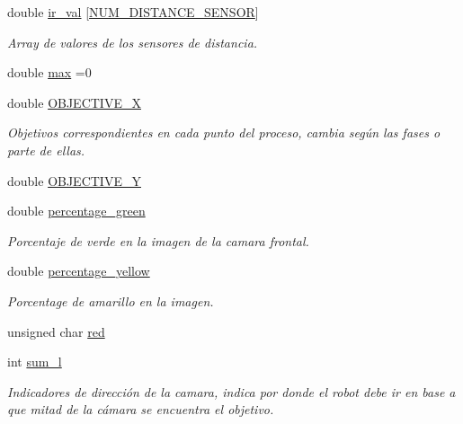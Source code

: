 \begin{DoxyCompactItemize}
\item 
double \hyperlink{classRescue_aaafc15a9b059bf1acbfa360915308fe5_aaafc15a9b059bf1acbfa360915308fe5}{ir\+\_\+val} \mbox{[}\hyperlink{Rescue_8h_a3bfa6c68d124846bd629eef1504b2556_a3bfa6c68d124846bd629eef1504b2556}{N\+U\+M\+\_\+\+D\+I\+S\+T\+A\+N\+C\+E\+\_\+\+S\+E\+N\+S\+OR}\mbox{]}
\begin{DoxyCompactList}\small\item\em Array de valores de los sensores de distancia. \end{DoxyCompactList}\item 
double \hyperlink{classRescue_aa1e9ec232ed1643bf2c889be84c8f4af_aa1e9ec232ed1643bf2c889be84c8f4af}{max} =0
\item 
double \hyperlink{classRescue_a8a98fdaa1deed080b4f8798f769f46cc_a8a98fdaa1deed080b4f8798f769f46cc}{O\+B\+J\+E\+C\+T\+I\+V\+E\+\_\+X}
\begin{DoxyCompactList}\small\item\em Objetivos correspondientes en cada punto del proceso, cambia según las fases o parte de ellas. \end{DoxyCompactList}\item 
double \hyperlink{classRescue_a54840a89d4f27081c433d70e1a78022f_a54840a89d4f27081c433d70e1a78022f}{O\+B\+J\+E\+C\+T\+I\+V\+E\+\_\+Y}
\item 
double \hyperlink{classRescue_a37191f058e32b0d1e8c184cfbf6daf5f_a37191f058e32b0d1e8c184cfbf6daf5f}{percentage\+\_\+green}
\begin{DoxyCompactList}\small\item\em Porcentaje de verde en la imagen de la camara frontal. \end{DoxyCompactList}\item 
double \hyperlink{classRescue_ad0101336342f1b5e9753b692d0d8b484_ad0101336342f1b5e9753b692d0d8b484}{percentage\+\_\+yellow}
\begin{DoxyCompactList}\small\item\em Porcentage de amarillo en la imagen. \end{DoxyCompactList}\item 
unsigned char \hyperlink{classRescue_af9ba54390762489e7f5c13ea8623b745_af9ba54390762489e7f5c13ea8623b745}{red}
\item 
int \hyperlink{classRescue_a92ae48ef6c0bb371cb0ea9c6eb4a8a87_a92ae48ef6c0bb371cb0ea9c6eb4a8a87}{sum\+\_\+l}
\begin{DoxyCompactList}\small\item\em Indicadores de dirección de la camara, indica por donde el robot debe ir en base a que mitad de la cámara se encuentra el objetivo. \end{DoxyCompactList}\item 

\end{DoxyCompactItemize}
